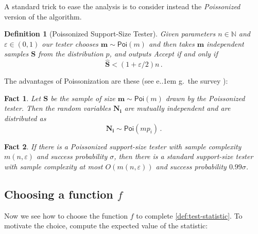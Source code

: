 \documentclass[10pt,a4paper]{article}
\newtheorem{fact}{Fact}[section]
\newtheorem{definition}{Definition}[section]
\newcommand*\eg{e.\kern.1em g.\ }
\newcommand{\bN}{\ensuremath{\mathbb{N}}}
\newcommand{\Poi}{\mathsf{Poi}}
\newcommand{\successprob}{\sigma}
\renewcommand{\epsilon}{\varepsilon}
\begin{document}
A standard trick to ease the analysis is to consider instead the \emph{Poissonized} version of the
algorithm.
\begin{definition}[Poissonized Support-Size Tester]
\label{def:poisson-tester}
Given parameters $n \in \bN$ and $\epsilon \in (0,1)$ our tester chooses $\bm{m} \sim \Poi(m)$ and
then takes $\bm{m}$ independent samples $\bm{S}$ from the distribution $p$, and outputs
\textsf{Accept} if and only if
\[
  \bm{\widehat S} < (1 + \epsilon/2) n \,.
\]
\end{definition}

The advantages of Poissonization are these (see \eg the survey \cite{Can20}):

\begin{fact}
\label{fact:poisson}
Let $\bm S$ be the sample of size $\bm m \sim \Poi(m)$ drawn by the Poissonized tester.
Then the random variables $\bm{N_i}$ are mutually independent and are distributed as
\[
  \bm{N_i} \sim \Poi(m p_i) \,.
\]
\end{fact}

\begin{fact}
\label{fact:poissonization}
If there is a Poissonized support-size tester with sample complexity $m(n,\epsilon)$ and success
probability $\successprob$, then there is a standard support-size tester with sample complexity at
most $O(m(n,\epsilon))$ and success probability $0.99 \successprob$.
\end{fact}



\subsection{Choosing a function \texorpdfstring{$f$}{f}}
\label{section:choosing_f}

Now we see how to choose the function $f$ to complete \cref{def:test-statistic}. To motivate the
choice, compute the expected value of the statistic:
\end{document}
